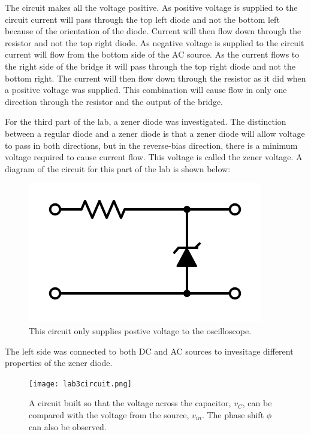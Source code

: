 \documentclass[twocolumn, amsmath]{revtex4}
\begin{document}
The circuit makes all the voltage positive. As positive voltage is supplied to the circuit current will pass through the top left diode and not the bottom left because of the orientation of the diode. Current will then flow down through the resistor and not the top right diode. As negative voltage is supplied to the circuit current will flow from the bottom side of the AC source. As the current flows to the right side of the bridge it will pass through the top right diode and not the bottom right. The current will then flow down through the resistor as it did when a positive voltage was supplied. This combination will cause flow in only one direction through the resistor and the output of the bridge.

For the third part of the lab, a zener diode was investigated. The distinction between a regular diode and a zener diode is that a zener diode will allow voltage to pass in both directions, but in the reverse-bias direction, there is a minimum voltage required to cause current flow. This voltage is called the zener voltage. A diagram of the circuit for this part of the lab is shown below:

\begin{figure}
    \includegraphics[scale=0.6]{zener.png}  
    \caption{This circuit only supplies postive voltage to the oscilloscope.}
\end{figure}

The left side was connected to both DC and AC sources to invesitage different properties of the zener diode. 


\begin{figure}
    \texttt{[image: lab3circuit.png]}  
    \caption{A circuit built so that the voltage across the capacitor, $v_C$, can be compared with the voltage from the source, $v_{in}$. The phase shift $\phi$ can also be observed.}
\end{figure}
\end{document}
